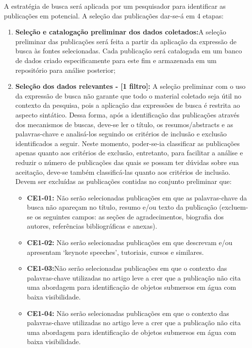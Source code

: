 A estratégia de busca será aplicada por um pesquisador para identificar as publicações em potencial. A seleção das publicações dar-se-á em 4 etapas:
\begin{enumerate}
\item \textbf{Seleção e catalogação preliminar dos dados coletados:}A seleção preliminar das publicações será feita a partir da aplicação da expressão de busca às fontes selecionadas. Cada publicação será catalogada em um banco de dados criado especificamente para este fim e armazenada em um repositório para análise posterior;
%
\item \textbf{Seleção dos dados relevantes - [1 filtro]:} A seleção preliminar com o uso da expressão de busca não garante que todo o material coletado seja útil no contexto da pesquisa, pois a aplicação das expressões de busca é restrita ao aspecto sintático. Dessa forma, após a identificação das publicações através dos mecanismos de buscas, deve-se ler o título, os resumos/abstracts e as palavras-chave e analisá-los seguindo os critérios de inclusão e exclusão identificados a seguir. Neste momento, poder-se-ia classificar as publicações apenas quanto aos critérios de exclusão, entretanto, para facilitar a análise e reduzir o número de publicações das quais se possam ter dúvidas sobre sua aceitação, deve-se também classificá-las quanto aos critérios de inclusão. Devem ser excluídas as publicações contidas no conjunto preliminar que:
%
	\begin{itemize}
	\item \textbf{CE1-01:} Não serão selecionadas publicações em que as palavras-chave da busca não apareçam no título, resumo e/ou texto da publicação (excluem-se os seguintes campos: as seções de agradecimentos, biografia dos autores, referências bibliográficas e anexas).
	\item \textbf{CE1-02:} Não serão selecionadas publicações em que descrevam e/ou apresentam ‘keynote speeches’, tutoriais, cursos e similares.
    
	\item \textbf{CE1-03:}Não serão selecionadas publicações em que o contexto das palavras-chave utilizadas no artigo leve a crer que a publicação não cita uma abordagem para identificação de objetos submersos em água com baixa visibilidade. 
	\item \textbf{CE1-04:} Não serão selecionadas publicações em que o contexto das palavras-chave utilizadas no artigo leve a crer que a publicação não cita uma abordagem para identificação de objetos submersos em água com baixa visibilidade.
\end{itemize}
\end{enumerate}

